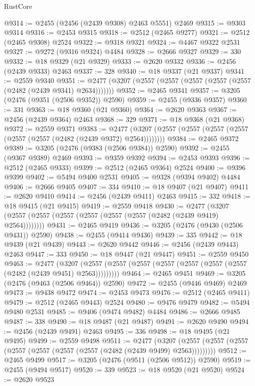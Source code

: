 \begin{lexlean}{RustCore}
\begin{coremodule}
@9314 := @2455 (@2456 (@2439 @9308) @2463 @5551) @2469
@9315 := @9303 @9314
@9316 := @2453 @9315
@9318 := @2512 (@2465 @9277)
@9321 := @2512 (@2465 @9308) @2524
@9322 := @9318 @9321
@9324 := @4467 @9322 @2531
@9327 := @9272 (@9316 @9324) @4484
@9328 := @2666 @9327
@9329 := 330
@9332 := @18 @9329 (@21 @9329)
@9333 := @2620 @9332
@9336 := @2456 (@2439 @9333) @2463
@9337 := 328
@9340 := @18 @9337 (@21 @9337)
@9341 := @2559 @9340
@9351 := @2477 (@3207 (@2557 (@2557 (@2557 (@2557 (@2557 (@2482 (@2439 @9341) @2634)))))))
@9352 := @2465 @9341
@9357 := @3205 (@2476 (@9351 (@2506 @9352)) @2590)
@9359 := @2455 (@9336 @9357)
@9360 := 331
@9363 := @18 @9360 (@21 @9360)
@9364 := @2620 @9363
@9367 := @2456 (@2439 @9364) @2463
@9368 := 329
@9371 := @18 @9368 (@21 @9368)
@9372 := @2559 @9371
@9383 := @2477 (@3207 (@2557 (@2557 (@2557 (@2557 (@2557 (@2557 (@2482 (@2439 @9372) @2564))))))))
@9384 := @2465 @9372
@9389 := @3205 (@2476 (@9383 (@2506 @9384)) @2590)
@9392 := @2455 (@9367 @9389) @2469
@9393 := @9359 @9392
@9394 := @2453 @9393
@9396 := @2512 (@2465 @9333)
@9399 := @2512 (@2465 @9364) @2524
@9400 := @9396 @9399
@9402 := @5494 @9400 @2531
@9405 := @9328 (@9394 @9402) @4484
@9406 := @2666 @9405
@9407 := 334
@9410 := @18 @9407 (@21 @9407)
@9411 := @2620 @9410
@9414 := @2456 (@2439 @9411) @2463
@9415 := 332
@9418 := @18 @9415 (@21 @9415)
@9419 := @2559 @9418
@9430 := @2477 (@3207 (@2557 (@2557 (@2557 (@2557 (@2557 (@2557 (@2482 (@2439 @9419) @2564))))))))
@9431 := @2465 @9419
@9436 := @3205 (@2476 (@9430 (@2506 @9431)) @2590)
@9438 := @2455 (@9414 @9436)
@9439 := 335
@9442 := @18 @9439 (@21 @9439)
@9443 := @2620 @9442
@9446 := @2456 (@2439 @9443) @2463
@9447 := 333
@9450 := @18 @9447 (@21 @9447)
@9451 := @2559 @9450
@9463 := @2477
    (@3207 (@2557 (@2557 (@2557 (@2557 (@2557 (@2557 (@2557 (@2482 (@2439 @9451) @2563)))))))))
@9464 := @2465 @9451
@9469 := @3205 (@2476 (@9463 (@2506 @9464)) @2590)
@9472 := @2455 (@9446 @9469) @2469
@9473 := @9438 @9472
@9474 := @2453 @9473
@9476 := @2512 (@2465 @9411)
@9479 := @2512 (@2465 @9443) @2524
@9480 := @9476 @9479
@9482 := @5494 @9480 @2531
@9485 := @9406 (@9474 @9482) @4484
@9486 := @2666 @9485
@9487 := 338
@9490 := @18 @9487 (@21 @9487)
@9491 := @2620 @9490
@9494 := @2456 (@2439 @9491) @2463
@9495 := 336
@9498 := @18 @9495 (@21 @9495)
@9499 := @2559 @9498
@9511 := @2477
    (@3207 (@2557 (@2557 (@2557 (@2557 (@2557 (@2557 (@2557 (@2482 (@2439 @9499) @2563)))))))))
@9512 := @2465 @9499
@9517 := @3205 (@2476 (@9511 (@2506 @9512)) @2590)
@9519 := @2455 (@9494 @9517)
@9520 := 339
@9523 := @18 @9520 (@21 @9520)
@9524 := @2620 @9523

\end{coremodule}
\end{lexlean}

